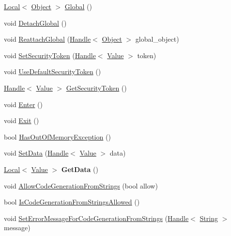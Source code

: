 \begin{DoxyCompactItemize}
\item 
\hyperlink{classv8_1_1_local}{Local}$<$ \hyperlink{classv8_1_1_object}{Object} $>$ \hyperlink{classv8_1_1_context_af5cd9f97ef6a3307c1c21f80f4b743eb}{Global} ()
\item 
void \hyperlink{classv8_1_1_context_a841c7dd92eb8c57df92a268a164dea97}{Detach\+Global} ()
\item 
void \hyperlink{classv8_1_1_context_a1db9a514d7bb1c055a26359727bd2f6b}{Reattach\+Global} (\hyperlink{classv8_1_1_handle}{Handle}$<$ \hyperlink{classv8_1_1_object}{Object} $>$ global\+\_\+object)
\item 
void \hyperlink{classv8_1_1_context_a288d8549547f6bdf4312f5333f60f24d}{Set\+Security\+Token} (\hyperlink{classv8_1_1_handle}{Handle}$<$ \hyperlink{classv8_1_1_value}{Value} $>$ token)
\item 
void \hyperlink{classv8_1_1_context_aa9e1a14982b64fd51ab87600a287bad2}{Use\+Default\+Security\+Token} ()
\item 
\hyperlink{classv8_1_1_handle}{Handle}$<$ \hyperlink{classv8_1_1_value}{Value} $>$ \hyperlink{classv8_1_1_context_a8e71e658633518ca7718c0f6e938c6a9}{Get\+Security\+Token} ()
\item 
void \hyperlink{classv8_1_1_context_a6995c49d9897eb49053f07874b825133}{Enter} ()
\item 
void \hyperlink{classv8_1_1_context_a2db09d4fefb26023a40d88972a4c1599}{Exit} ()
\item 
bool \hyperlink{classv8_1_1_context_aadec400a5da1e79e58a8770fd706b9a0}{Has\+Out\+Of\+Memory\+Exception} ()
\item 
void \hyperlink{classv8_1_1_context_a5121f42bf87ec10563e687761e750f53}{Set\+Data} (\hyperlink{classv8_1_1_handle}{Handle}$<$ \hyperlink{classv8_1_1_value}{Value} $>$ data)
\item 
\hypertarget{classv8_1_1_context_a0c5edad65549bf11edce29bfa3bc3aef}{}\hyperlink{classv8_1_1_local}{Local}$<$ \hyperlink{classv8_1_1_value}{Value} $>$ {\bfseries Get\+Data} ()\label{classv8_1_1_context_a0c5edad65549bf11edce29bfa3bc3aef}

\item 
void \hyperlink{classv8_1_1_context_a794ccc42113566f5d363f89c8b0d3c2c}{Allow\+Code\+Generation\+From\+Strings} (bool allow)
\item 
bool \hyperlink{classv8_1_1_context_aa7a960a232d232d1a2a904c2e6c18831}{Is\+Code\+Generation\+From\+Strings\+Allowed} ()
\item 
void \hyperlink{classv8_1_1_context_a6a8d067b246b8792b19e8075bc410f1d}{Set\+Error\+Message\+For\+Code\+Generation\+From\+Strings} (\hyperlink{classv8_1_1_handle}{Handle}$<$ \hyperlink{classv8_1_1_string}{String} $>$ message)
\end{DoxyCompactItemize}

